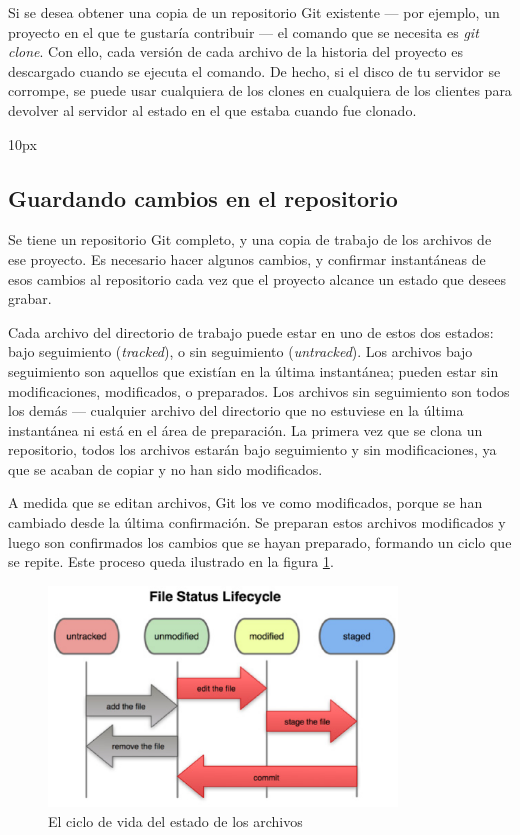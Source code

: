 Si se desea obtener una copia de un repositorio Git existente --- por ejemplo, un proyecto en el que te gustaría contribuir --- el comando que se necesita es {\it git clone}. Con ello, cada versión de cada archivo de la historia del proyecto es descargado cuando se ejecuta el comando. De hecho, si el disco de tu servidor se corrompe, se puede usar cualquiera de los clones en cualquiera de los clientes para devolver al servidor al estado en el que estaba cuando fue clonado.

\begin{center}{
	\fboxsep 10px
	}
\end{center}

%
%
\subsection{Guardando cambios en el repositorio}

Se tiene un repositorio Git completo, y una copia de trabajo de los archivos de ese proyecto. Es necesario hacer algunos cambios, y confirmar instantáneas de esos cambios al repositorio cada vez que el proyecto alcance un estado que desees grabar.

Cada archivo del directorio de trabajo puede estar en uno de estos dos estados: bajo seguimiento ({\it tracked}), o sin seguimiento ({\it untracked}). Los archivos bajo seguimiento son aquellos que existían en la última instantánea; pueden estar sin modificaciones, modificados, o preparados. Los archivos sin seguimiento son todos los demás --- cualquier archivo del directorio que no estuviese en la última instantánea ni está en el área de preparación. La primera vez que se clona un repositorio, todos los archivos estarán bajo seguimiento y sin modificaciones, ya que se acaban de copiar y no han sido modificados.

A medida que se editan archivos, Git los ve como modificados, porque se han cambiado desde la última confirmación. Se preparan estos archivos modificados y luego son confirmados los cambios que se hayan preparado, formando un ciclo que se repite. Este proceso queda ilustrado en la figura \ref{fig:ciclo_vida_estado_archivos}.

\begin{figure}
  \centering
    \includegraphics[width=350px]{./eps/git/git_ciclo_vida_status_archivos.eps}
  \caption{El ciclo de vida del estado de los archivos}
  \label{fig:ciclo_vida_estado_archivos}
\end{figure}

